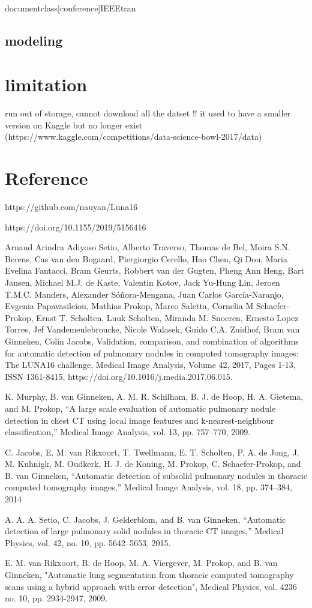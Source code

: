 \\documentclass[conference]{IEEEtran}
\begin{document}
\subsection{modeling}


\section{limitation}
run out of storage, cannot download all the datset !!
it used to have a smaller version on Kaggle but no longer exist (https://www.kaggle.com/competitions/data-science-bowl-2017/data)

\section{Reference}
   \item https://github.com/nauyan/Luna16
   \item https://doi.org/10.1155/2019/5156416
    \item Arnaud Arindra Adiyoso Setio, Alberto Traverso, Thomas de Bel, Moira S.N. Berens, Cas van den Bogaard, Piergiorgio Cerello, Hao Chen, Qi Dou, Maria Evelina Fantacci, Bram Geurts, Robbert van der Gugten, Pheng Ann Heng, Bart Jansen, Michael M.J. de Kaste, Valentin Kotov, Jack Yu-Hung Lin, Jeroen T.M.C. Manders, Alexander Sóñora-Mengana, Juan Carlos García-Naranjo, Evgenia Papavasileiou, Mathias Prokop, Marco Saletta, Cornelia M Schaefer-Prokop, Ernst T. Scholten, Luuk Scholten, Miranda M. Snoeren, Ernesto Lopez Torres, Jef Vandemeulebroucke, Nicole Walasek, Guido C.A. Zuidhof, Bram van Ginneken, Colin Jacobs,
Validation, comparison, and combination of algorithms for automatic detection of pulmonary nodules in computed tomography images: The LUNA16 challenge,
Medical Image Analysis,
Volume 42,
2017,
Pages 1-13,
ISSN 1361-8415,
https://doi.org/10.1016/j.media.2017.06.015.
  \item K. Murphy, B. van Ginneken, A. M. R. Schilham, B. J. de Hoop, H. A. Gietema, and M. Prokop, “A large scale evaluation of automatic pulmonary nodule detection in chest CT using local image features and k-nearest-neighbour classification,” Medical Image Analysis, vol. 13, pp. 757–770, 2009.
  \item C. Jacobs, E. M. van Rikxoort, T. Twellmann, E. T. Scholten, P. A. de Jong, J. M. Kuhnigk, M. Oudkerk, H. J. de Koning, M. Prokop, C. Schaefer-Prokop, and B. van Ginneken, “Automatic detection of subsolid pulmonary nodules in thoracic computed tomography images,” Medical Image Analysis, vol. 18, pp. 374–384, 2014
  \item A. A. A. Setio, C. Jacobs, J. Gelderblom, and B. van Ginneken, “Automatic detection of large pulmonary solid nodules in thoracic CT images,” Medical Physics, vol. 42, no. 10, pp. 5642–5653, 2015.
  \item E. M. van Rikxoort, B. de Hoop, M. A. Viergever, M. Prokop, and B. van Ginneken, "Automatic lung segmentation from thoracic computed tomography scans using a hybrid approach with error detection", Medical Physics, vol. 4236 no. 10, pp. 2934-2947, 2009.
   
\end{document}
